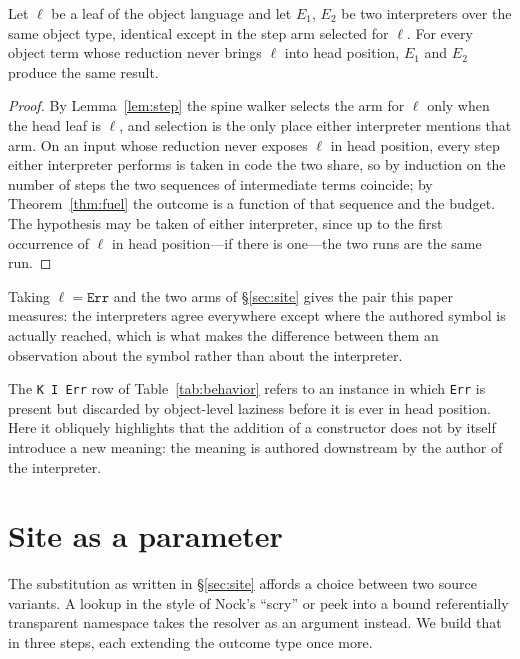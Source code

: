\documentclass[review]{jfp-epi}
\begin{document}
\begin{lemma}\label{lem:faithful}
Let $\ell$ be a leaf of the object language and let $E_1$, $E_2$ be two
interpreters over the same object type, identical except in the step arm
selected for $\ell$.  For every object term whose reduction never brings
$\ell$ into head position, $E_1$ and $E_2$ produce the same result.
\end{lemma}

\begin{proof}
By Lemma~\ref{lem:step} the spine walker selects the arm for $\ell$ only
when the head leaf is $\ell$, and selection is the only place either
interpreter mentions that arm.  On an input whose reduction never
exposes $\ell$ in head position, every step either interpreter performs
is taken in code the two share, so by induction on the number of steps
the two sequences of intermediate terms coincide; by
Theorem~\ref{thm:fuel} the outcome is a function of that sequence and
the budget.  The hypothesis may be taken of either interpreter, since up
to the first occurrence of $\ell$ in head position---if there is
one---the two runs are the same run.
\end{proof}

Taking $\ell = \texttt{Err}$ and the two arms of \S\ref{sec:site} gives
the pair this paper measures: the interpreters agree everywhere except
where the authored symbol is actually reached, which is what makes the
difference between them an observation about the symbol rather than
about the interpreter.

The \texttt{K I Err} row of Table~\ref{tab:behavior} refers to an
instance in which \texttt{Err} is present but discarded by object-level
laziness before it is ever in head position. Here it obliquely
highlights that the addition of a constructor does not by itself
introduce a new meaning:  the meaning is authored downstream by the
author of the interpreter.

\section{Site as a parameter}\label{sec:scry}

The substitution as written in \S\ref{sec:site} affords a choice between
two source variants. A lookup in the style of Nock's ``scry'' or peek
into a bound referentially transparent namespace takes the resolver as
an argument instead. We build that in three steps, each extending the
outcome type once more.
\end{document}
